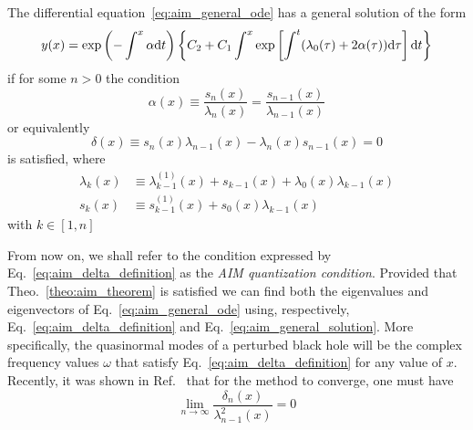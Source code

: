 \begin{theorem}
  The differential equation~\eqref{eq:aim_general_ode} has a general solution of the form
  \begin{equation}
    y(x) = \exp\left( -\int^x\alpha\mathrm{d} t \right) \left\{ C_2 + C_1 \int^{x} \exp \left[ \int^{t} ( \lambda_0(\tau) + 2\alpha(\tau) )\mathrm{d} \tau \right] \mathrm{d} t \right\}
    \label{eq:aim_general_solution}
  \end{equation}
  if for some $n>0$ the condition
  \begin{equation}
    \alpha(x) \equiv \frac{s_n(x)}{\lambda_n(x)} = \frac{s_{n-1}(x)}{\lambda_{n-1}(x)}
    \label{eq:aim_alpha_definition}
  \end{equation}
  or equivalently
  \begin{equation}
    \delta(x) \equiv s_n(x)\lambda_{n-1}(x) - \lambda_{n}(x)s_{n-1}(x) = 0
    \label{eq:aim_delta_definition}
  \end{equation}
  is satisfied, where
  \begin{align}
    \lambda_k(x) & \equiv \lambda^{(1)}_{k-1}(x) + s_{k-1}(x) + \lambda_0(x)\lambda_{k-1}(x) \label{eq:aim_lambda_k} \\
    s_k(x)       & \equiv       s^{(1)}_{k-1}(x) + s_0(x)\lambda_{k-1}(x) \label{eq:aim_sk}
  \end{align}
  with $k \in [1, n]$
  \label{theo:aim_theorem}
\end{theorem}
%
From now on, we shall refer to the condition expressed by Eq.~\eqref{eq:aim_delta_definition} as the \emph{AIM quantization condition}. Provided that Theo.~\ref{theo:aim_theorem} is satisfied we can find both the eigenvalues and eigenvectors of Eq.~\eqref{eq:aim_general_ode} using, respectively, Eq.~\eqref{eq:aim_delta_definition} and Eq.~\eqref{eq:aim_general_solution}. More specifically, the quasinormal modes of a perturbed black hole will be the complex frequency values $\omega$ that satisfy Eq.~\eqref{eq:aim_delta_definition} for any value of $x$. Recently, it was shown in Ref.~\cite{Ismail2020} that for the method to converge, one must have
%
\begin{equation}
  \lim_{n \rightarrow \infty} \frac{\delta_n(x)}{\lambda_{n-1}^2(x)} = 0
  \label{eq:aim_convergence_criteria}
\end{equation}

